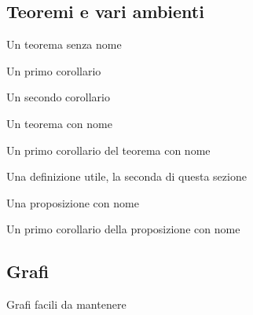\subsection{ Teoremi e vari ambienti }

\begin{theorem}
    Un teorema senza nome
\end{theorem}

\begin{corollario}
    Un primo corollario
\end{corollario}

\begin{corollario}
    Un secondo corollario
\end{corollario}

\begin{theorem}
    Un teorema con nome
\end{theorem}

\begin{corollario}
    Un primo corollario del teorema con nome
\end{corollario}

\begin{definition}
    Una definizione utile, la seconda di questa sezione
\end{definition}

\begin{proposizione}
    Una proposizione con nome
\end{proposizione}

\begin{corollario}
    Un primo corollario della proposizione con nome
\end{corollario}

\subsection{Grafi}

Grafi facili da mantenere



